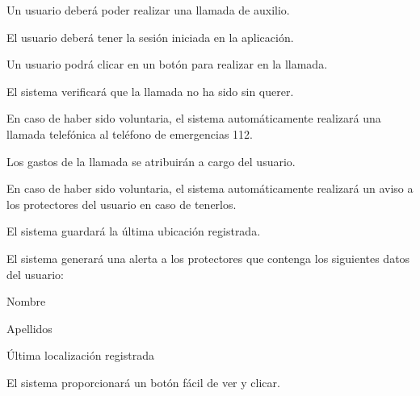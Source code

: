 \begin{myEnumerate}[resume*]
  \item Un usuario deberá poder realizar una llamada de auxilio.
  \begin{myEnumerate}
    \item El usuario deberá tener la sesión iniciada en la aplicación.
  	\item Un usuario podrá clicar en un botón para realizar en la llamada.
  	\begin{myEnumerate}
  		\item El sistema verificará que la llamada no ha sido sin querer.
  		\begin{myEnumerate}
  			\item En caso de haber sido voluntaria, el sistema automáticamente realizará una llamada telefónica al teléfono de emergencias 112.
  				\begin{myEnumerate}
  					\item Los gastos de la llamada se atribuirán a cargo del usuario.
				\end{myEnumerate}
  			\item En caso de haber sido voluntaria, el sistema automáticamente realizará un aviso a los protectores del usuario en caso de tenerlos.
  				\begin{myEnumerate}
  					\item El sistema guardará la última ubicación registrada.
  					\item El sistema generará una alerta a los protectores que contenga los siguientes datos del usuario:
					 \begin{myEnumerate}
  						\item Nombre
  						\item Apellidos
  						\item Última localización registrada
  					 \end{myEnumerate}
			    \end{myEnumerate}
  		\end{myEnumerate}
  	\end{myEnumerate}
  	\item El sistema proporcionará un botón fácil de ver y clicar.
  \end{myEnumerate}
\end{myEnumerate}


